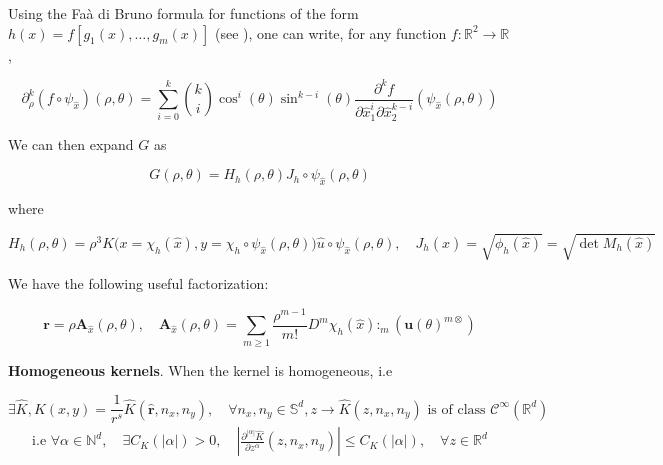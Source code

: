 ﻿\documentclass{article}
\begin{document}
\begin{lemma}\label{lemma:FaadiBruno-polar}
  
Using the Faà di Bruno formula for functions of the form $h(x) = f[g_1(x), \dots, g_m(x)]$ (see \cite{constantine_multivariate_1996}), one can write, for any function $f : \mathbb R^{2} \to \mathbb R$,

\begin{equation}\label{eq:FaadiBruno-polar}
  \partial^k_{\rho} (f\circ\psi_{\hat x})(\rho, \theta) = \sum_{i=0}^{k}\binom{k}{i}\cos^i(\theta)\sin^{k-i}(\theta)\frac{\partial^k f}{\partial \hat x_1^i\partial \hat x_2^{k-i}}(\psi_{\hat x}(\rho, \theta))
\end{equation}
\end{lemma}

We can then expand $G$ as

\begin{equation}
  G(\rho, \theta) = H_h(\rho, \theta)J_h\circ\psi_{\hat x}(\rho, \theta)
\end{equation}

where

\begin{equation}\label{eq:Hh-def}
  H_h(\rho, \theta) = \rho^3K\Big(x = \chi_h(\hat x), y = \chi_h\circ\psi_{\hat x}(\rho, \theta)\Big)\hat u\circ\psi_{\hat x}(\rho, \theta), \quad J_h(\hat x) = \sqrt{\phi_h(\hat x)} = \sqrt{\det M_h(\hat x)}
\end{equation}


\begin{lemma}\label{lemma:factorization-radius}
  We have the following useful factorization:

\begin{equation}
  \bm r = \rho\bm A_{\hat x}(\rho, \theta), \quad \bm A_{\hat x}(\rho, \theta) = \sum_{m\geq 1}\frac{\rho^{m-1}}{m!}D^m\chi_h(\hat x):_m\left(\bm u(\theta)^{m\otimes}\right)
\end{equation}
\end{lemma}

\textbf{Homogeneous kernels}. When the kernel is homogeneous, i.e 

$$\exists \hat K, K(x, y) = \frac{1}{r^s}\hat K(\mathbf{\hat r}, n_x, n_y), \quad\forall n_x, n_y \in \mathbb S^{d}, z\to \hat K(z, n_x, n_y) \text{ is of class } \mathcal C^{\infty}(\mathbb R^d)$$
\begin{align}\label{ineq:reg-pol-kernel}
  \text{i.e } \forall \alpha\in\mathbb N^d, \quad \exists C_K(|\alpha|) > 0, \quad \left|\frac{\partial^{|\alpha|}\hat K}{\partial z^{\alpha}}(z, n_x, n_y)\right| \leq C_K(|\alpha|), \quad \forall z\in\mathbb R^d
\end{align}
\end{document}
